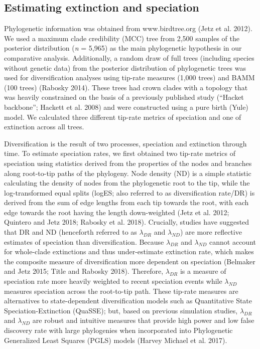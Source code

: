 \documentclass[]{article}
\begin{document}
\hypertarget{estimating-extinction-and-speciation}{%
\subsection{Estimating extinction and
speciation}\label{estimating-extinction-and-speciation}}

Phylogenetic information was obtained from www.birdtree.org (Jetz et al.
2012). We used a maximum clade credibility (MCC) tree from 2,500 samples
of the posterior distribution (\emph{n} = 5,965) as the main
phylogenetic hypothesis in our comparative analysis. Additionally, a
random draw of full trees (including species without genetic data) from
the posterior distribution of phylogenetic trees was used for
diversification analyses using tip-rate measures (1,000 trees) and BAMM
(100 trees) (Rabosky 2014). These trees had crown clades with a topology
that was heavily constrained on the basis of a previously published
study (``Hacket backbone''; Hackett et al. 2008) and were constructed
using a pure birth (Yule) model. We calculated three different tip-rate
metrics of speciation and one of extinction across all trees.

Diversification is the result of two processes, speciation and
extinction through time. To estimate speciation rates, we first obtained
two tip-rate metrics of speciation using statistics derived from the
properties of the nodes and branches along root-to-tip paths of the
phylogeny. Node density (ND) is a simple statistic calculating the
density of nodes from the phylogenetic root to the tip, while the
log-transformed equal splits (logES; also referred to as diversification
rate/DR) is derived from the sum of edge lengths from each tip towards
the root, with each edge towards the root having the length
down-weighted (Jetz et al. 2012; Quintero and Jetz 2018; Rabosky et al.
2018). Crucially, studies have suggested that DR and ND (henceforth
referred to as \(\lambda_{DR}\) and \(\lambda_{ND}\)) are more
reflective estimates of speciation than diversification. Because
\(\lambda_{DR}\) and \(\lambda_{ND}\) cannot account for whole-clade
extinctions and thus under-estimate extinction rate, which makes the
composite measure of diversification more dependent on speciation
(Belmaker and Jetz 2015; Title and Rabosky 2018). Therefore,
\(\lambda_{DR}\) is a measure of speciation rate more heavily weighted
to recent speciation events while \(\lambda_{ND}\) measures speciation
across the root-to-tip path. These tip-rate measures are alternatives to
state-dependent diversification models such as Quantitative State
Speciation-Extinction (QuaSSE); but, based on previous simulation
studies, \(\lambda_{DR}\) and \(\lambda_{ND}\) are robust and intuitive
measures that provide high power and low false discovery rate with large
phylogenies when incorporated into Phylogenetic Generalized Least
Squares (PGLS) models (Harvey Michael et al. 2017).
\end{document}
